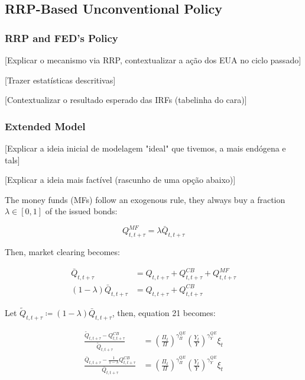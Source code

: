 \documentclass[12pt]{article}
\begin{document}
\subsection{RRP-Based Unconventional Policy}

\subsubsection{RRP and FED's Policy}

[Explicar o mecanismo via RRP, contextualizar a ação dos EUA no ciclo passado]

[Trazer estatísticas descritivas]

[Contextualizar o resultado esperado das IRFs (tabelinha do cara)]


\subsubsection{Extended Model}

[Explicar a ideia inicial de modelagem "ideal" que tivemos, a mais endógena e tals]

[Explicar a ideia mais factível (rascunho de uma opção abaixo)]

\newpage

The money funds (MFs) follow an exogenous rule, they always buy a fraction $\lambda \in [0,1]$ of the issued bonds:

$$
Q^{MF}_{t,t+\tau} = \lambda \bar Q_{t,t+\tau}
$$

Then, market clearing becomes:

\begin{align*}
\bar Q_{t,t+\tau} &= Q_{t,t+\tau} + Q^{CB}_{t,t+\tau} + Q^{MF}_{t,t+\tau}\\
(1-\lambda)\bar Q_{t,t+\tau} &= Q_{t,t+\tau} + Q^{CB}_{t,t+\tau}
\end{align*}

Let $\tilde Q_{t,t+\tau} \coloneqq (1-\lambda)\bar Q_{t,t+\tau}$, then, equation 21 becomes:

\begin{align*}
\frac{\tilde Q_{t,t+\tau} - Q^{CB}_{t,t+\tau}}{\tilde Q_{t,t+\tau}} &= \left(\frac{\Pi_t}{\Pi}\right)^{\gamma^{QE}_\Pi}\left(\frac{Y_t}{Y}\right)^{\gamma^{QE}_Y}\xi_t\\
\frac{\bar Q_{t,t+\tau} - \frac{1}{1-\lambda}Q^{CB}_{t,t+\tau}}{\bar Q_{t,t+\tau}} &= \left(\frac{\Pi_t}{\Pi}\right)^{\gamma^{QE}_\Pi}\left(\frac{Y_t}{Y}\right)^{\gamma^{QE}_Y}\xi_t
\end{align*}
\end{document}
